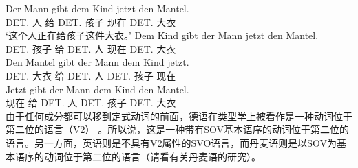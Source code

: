 \eal
\ex 
\gll Der Mann gibt dem Kind jetzt den Mantel.\\
      DET.\nom{} 人 给 DET.\dat{} 孩子 现在 DET.\acc{} 大衣\\
\glt `这个人正在给孩子这件大衣。'
\ex 
\gll Dem Kind gibt der Mann jetzt den Mantel.\\
     DET.\dat{} 孩子 给 DET.\nom{} 人 现在 DET.\acc{} 大衣\\
\ex 
\gll Den Mantel gibt der Mann dem Kind jetzt.\\
	 DET.\acc{} 大衣 给 DET.\nom{} 人 DET.\dat{} 孩子 现在\\
\ex 
\gll Jetzt gibt der Mann dem Kind den Mantel.\\
	 现在 给 DET.\nom{} 人 DET.\dat{} 孩子 DET.\acc{} 大衣\\
\zl
由于任何成分都可以移到定式动词的前面，德语在类型学上被看作是一种动词位于第二位的语言（V2） 。所以说，这是一种带有SOV基本语序的动词位于第二位的语言。另一方面，英语则是不具有V2属性的SVO语言，而丹麦语则是以SOV为基本语序的动词位于第二位的语言（请看\citealp{Oersnes2009b}有关丹麦语的研究）。

